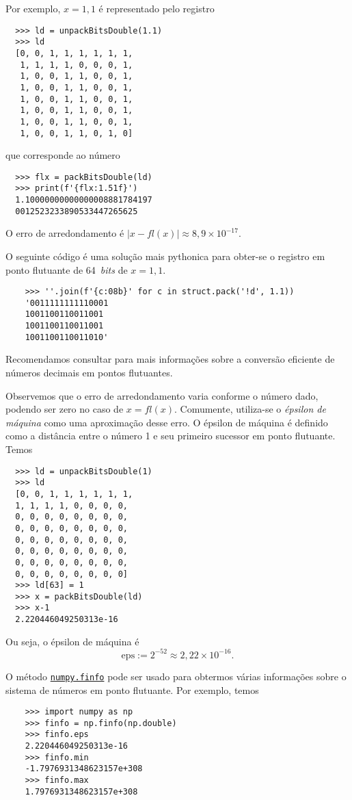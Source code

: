Por exemplo, $x = 1,1$ é representado pelo registro
\begin{lstlisting}
  >>> ld = unpackBitsDouble(1.1)
  >>> ld
  [0, 0, 1, 1, 1, 1, 1, 1,
   1, 1, 1, 1, 0, 0, 0, 1,
   1, 0, 0, 1, 1, 0, 0, 1,
   1, 0, 0, 1, 1, 0, 0, 1,
   1, 0, 0, 1, 1, 0, 0, 1,
   1, 0, 0, 1, 1, 0, 0, 1,
   1, 0, 0, 1, 1, 0, 0, 1,
   1, 0, 0, 1, 1, 0, 1, 0]
\end{lstlisting}
que corresponde ao número
\begin{lstlisting}
  >>> flx = packBitsDouble(ld)
  >>> print(f'{flx:1.51f}')
  1.10000000000000008881784197
  0012523233890533447265625
\end{lstlisting}
O erro de arredondamento é $|x - fl(x)| \approx 8,9\times 10^{-17}$.

\begin{obs}\label{obs:unpackBitsDouble}
  O seguinte código é uma solução mais pythonica para obter-se o registro em ponto flutuante de 64~{\it bits} de $x = 1,1$.
  \begin{lstlisting}
    >>> ''.join(f'{c:08b}' for c in struct.pack('!d', 1.1))
    '0011111111110001
    1001100110011001
    1001100110011001
    1001100110011010'
  \end{lstlisting}
  Recomendamos consultar \cite{Lemire2021a} para mais informações sobre a conversão eficiente de números decimais em pontos flutuantes.
\end{obs}

Observemos que o erro de arredondamento varia conforme o número dado, podendo ser zero no caso de $x = fl(x)$. Comumente, utiliza-se o \emph{épsilon de máquina} como uma aproximação desse erro. O épsilon de máquina é definido como a distância entre o número 1 e seu primeiro sucessor em ponto flutuante. Temos
\begin{lstlisting}
  >>> ld = unpackBitsDouble(1)
  >>> ld
  [0, 0, 1, 1, 1, 1, 1, 1,
  1, 1, 1, 1, 0, 0, 0, 0,
  0, 0, 0, 0, 0, 0, 0, 0,
  0, 0, 0, 0, 0, 0, 0, 0,
  0, 0, 0, 0, 0, 0, 0, 0,
  0, 0, 0, 0, 0, 0, 0, 0,
  0, 0, 0, 0, 0, 0, 0, 0,
  0, 0, 0, 0, 0, 0, 0, 0]
  >>> ld[63] = 1
  >>> x = packBitsDouble(ld)
  >>> x-1
  2.220446049250313e-16
\end{lstlisting}
Ou seja, o épsilon de máquina é
\begin{equation}
  \mathrm{eps} := 2^{-52} \approx 2,22\times 10^{-16}.
\end{equation}

\begin{obs}
  O método \href{https://numpy.org/doc/stable/reference/generated/numpy.finfo.html}{\lstinline{numpy.finfo}} pode ser usado para obtermos várias informações sobre o sistema de números em ponto flutuante. Por exemplo, temos
  \begin{lstlisting}
    >>> import numpy as np
    >>> finfo = np.finfo(np.double)
    >>> finfo.eps
    2.220446049250313e-16
    >>> finfo.min
    -1.7976931348623157e+308
    >>> finfo.max
    1.7976931348623157e+308
  \end{lstlisting}
\end{obs}

